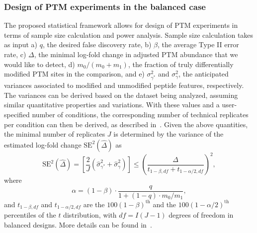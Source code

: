 \documentclass[mcp]{article}
\numberwithin{figure}{section} %
\numberwithin{table}{section}
\begin{document}
\subsubsection*{Design of PTM experiments in the balanced case}
\label{sec:design}

The proposed statistical framework allows for design of PTM experiments in terms of sample size calculation and power analysis. 
Sample size calculation takes as input a) $q$, the desired false discovery rate, b) $\beta$, the average Type II error rate, c) $\Delta$, the minimal log-fold change in adjusted PTM abundance that we would like to detect, d) $m_0 / (m_0 + m_1)$, the fraction of truly differentially modified PTM sites in the comparison, and e) $\sigma_{\gamma^{\ast}}^{2}$ and $\sigma_{\gamma}^{2}$, the anticipated variances associated to modified and unmodified peptide features, respectively. The variances can be derived based on the dataset being analyzed, assuming similar quantitative properties and variations. With these values and a user-specified number of conditions, the corresponding number of technical replicates per condition can then be derived, as described in~\cite{kutner_etal_04a}. Given the above quantities, the minimal number of replicates $J$ is determined by the variance of the estimated log-fold change $\mathrm{SE}^{2}(\hat{\Delta})$ as
\[
\mathrm{SE}^{2}(\hat{\Delta}) = \left[ \frac{2}{J} \left( \hat{\sigma}_{\gamma^{\ast}}^{2} + \hat{\sigma}_{\gamma}^{2} \right) \right]
\leq \left( \frac{\Delta}{t_{1-\beta, df} + t_{1-\alpha /2, df}} \right)^{2},
\]
where 
\[
\alpha = (1 - \beta) \cdot \frac{q}{1 + (1-q) \cdot m_0 / m_1},
\]
and $t_{1-\beta, df}$ and $t_{1-\alpha /2, df}$ are the $100(1-\beta)^{\text{th}}$ and the $100(1-\alpha /2)^{\text{th}}$ percentiles of the $t$ distribution, with $df = I(J-1)$ degrees of freedom in balanced designs. More details can be found in~\cite{oberg_vitek_09a}. 

\end{document}
